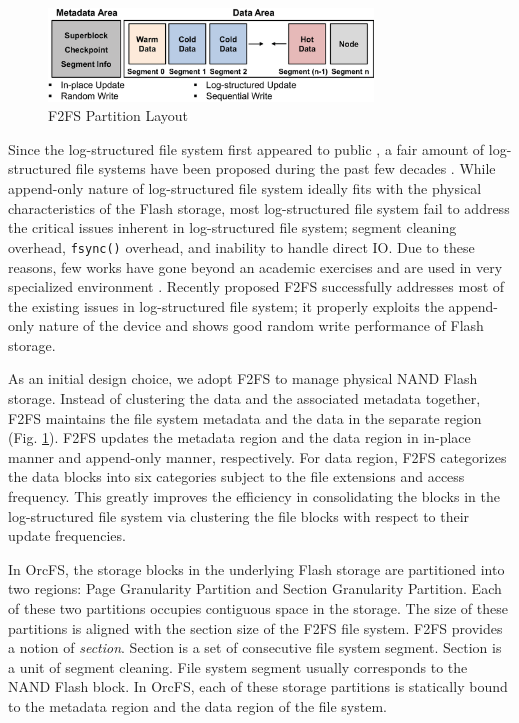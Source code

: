 \documentclass[prodmode,acmtecs]{acmsmall}
\begin{document}
\begin{figure}[t]
\begin{center}
\includegraphics[width=3.4in]{./figure/f2fs_layout}
\caption{F2FS Partition Layout}
\label{fig:f2fs_partition}
\end{center}
\end{figure}

Since the log-structured file system first appeared to public
\cite{rosenblum1992design}, a fair amount of log-structured file systems
have been proposed during the past few decades 
\cite{engel2005logfs,nilfs2006,lee2015f2fs,czezatke2000linlogfs,starwind_lsfs}. While
append-only nature of log-structured file system ideally fits with
the physical characteristics of the Flash storage, most log-structured
file system fail to address the critical issues inherent in
log-structured file system; segment cleaning overhead, \texttt{fsync()}
overhead, and inability to handle direct IO. Due to these reasons, few
works have gone beyond an academic exercises and are used in very
specialized environment \cite{nilfs2006}. Recently proposed F2FS \cite{lee2015f2fs} 
successfully addresses most of the existing issues in
log-structured file system; it properly exploits the append-only nature of the device
and shows good random write performance of Flash storage.


As an initial design choice, we adopt F2FS to manage physical NAND
Flash storage. Instead of clustering the data and the associated
metadata together, F2FS maintains the file system metadata and the
data in the separate region (Fig. \ref{fig:f2fs_partition}).  F2FS
updates the metadata region and the data region in in-place manner and
append-only manner, respectively.  For data region, F2FS categorizes
the data blocks into six categories subject to the file extensions and
access frequency. This greatly improves the efficiency in
consolidating the blocks in the log-structured file system via
clustering the file blocks with respect to their update frequencies.

In OrcFS, the storage blocks in the underlying Flash storage are
partitioned into two regions: Page Granularity Partition and Section
Granularity Partition.  Each of these two partitions occupies
contiguous space in the storage.  The size of these partitions is
aligned with the section size of the F2FS file system.  F2FS provides
a notion of \emph{section}. Section is a set of consecutive file system
segment. Section is a unit of segment cleaning. File system segment
usually corresponds to the NAND Flash block. In OrcFS, each of these
storage partitions is statically bound to the metadata region and the
data region of the file system.
\end{document}
